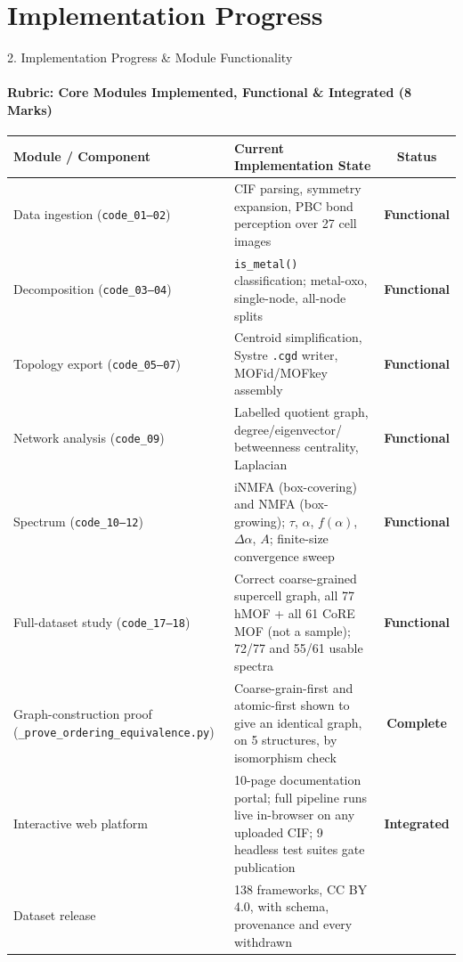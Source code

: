 \documentclass[aspectratio=169, 11pt]{beamer}
\begin{document}
\section{Implementation Progress}
\begin{frame}{2. Implementation Progress \& Module Functionality}
\framesubtitle{Rubric: Core Modules Implemented, Functional \& Integrated (8 Marks)}
\vspace{-0.32cm}
\begin{table}
\centering
\tiny
\renewcommand{\arraystretch}{0.99}
\begin{tabular}{p{3.0cm} p{7.0cm} c}
\toprule
\textbf{Module / Component} & \textbf{Current Implementation State} & \textbf{Status} \\
\midrule
Data ingestion (\texttt{code\_01--02}) & CIF parsing, symmetry expansion, PBC bond
perception over 27 cell images & \textcolor{okGreen}{\textbf{Functional}} \\
Decomposition (\texttt{code\_03--04}) & \texttt{is\_metal()} classification; metal-oxo,
single-node, all-node splits & \textcolor{okGreen}{\textbf{Functional}} \\
Topology export (\texttt{code\_05--07}) & Centroid simplification, Systre \texttt{.cgd}
writer, MOFid/MOFkey assembly & \textcolor{okGreen}{\textbf{Functional}} \\
Network analysis (\texttt{code\_09}) & Labelled quotient graph, degree/eigenvector/
betweenness centrality, Laplacian & \textcolor{okGreen}{\textbf{Functional}} \\
Spectrum (\texttt{code\_10--12}) & iNMFA (box-covering) and NMFA (box-growing);
$\tau$, $\alpha$, $f(\alpha)$, $\Delta\alpha$, $A$; finite-size convergence sweep &
\textcolor{okGreen}{\textbf{Functional}} \\
Full-dataset study (\texttt{code\_17--18}) & Correct coarse-grained supercell graph, all 77
hMOF + all 61 CoRE MOF (not a sample); 72/77 and 55/61 usable spectra &
\textcolor{okGreen}{\textbf{Functional}} \\
Graph-construction proof (\texttt{\_prove\_ordering\_equivalence.py}) & Coarse-grain-first
and atomic-first shown to give an identical graph, on 5 structures, by isomorphism check &
\textcolor{okGreen}{\textbf{Complete}} \\
Interactive web platform & 10-page documentation portal; full pipeline runs live in-browser
on any uploaded CIF; 9 headless test suites gate publication &
\textcolor{okGreen}{\textbf{Integrated}} \\
Dataset release & 138 frameworks, CC BY 4.0, with schema, provenance and every withdrawn

\end{tabular}
\end{table}
\end{frame}
\end{document}
